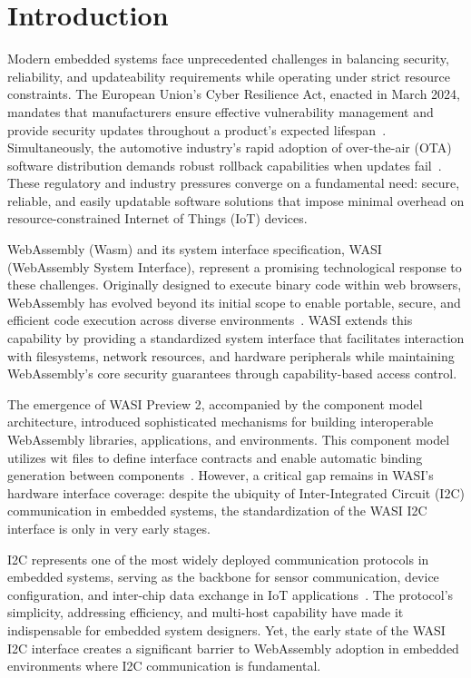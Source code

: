 \chapter{Introduction}
\label{chap:introduction}

Modern embedded systems face unprecedented challenges in balancing security, reliability, and updateability requirements while operating under strict resource constraints. The European Union's Cyber Resilience Act, enacted in March 2024, mandates that manufacturers ensure effective vulnerability management and provide security updates throughout a product's expected lifespan~\cite{eu_cyber_res_act}. Simultaneously, the automotive industry's rapid adoption of over-the-air (OTA) software distribution demands robust rollback capabilities when updates fail~\cite{automotive_ota}. These regulatory and industry pressures converge on a fundamental need: secure, reliable, and easily updatable software solutions that impose minimal overhead on resource-constrained Internet of Things (IoT) devices.

WebAssembly (Wasm) and its system interface specification, WASI (WebAssembly System Interface), represent a promising technological response to these challenges. Originally designed to execute binary code within web browsers, WebAssembly has evolved beyond its initial scope to enable portable, secure, and efficient code execution across diverse environments~\cite{wasm_spec}. WASI extends this capability by providing a standardized system interface that facilitates interaction with filesystems, network resources, and hardware peripherals while maintaining WebAssembly's core security guarantees through capability-based access control.

The emergence of WASI Preview 2, accompanied by the component model architecture, introduced sophisticated mechanisms for building interoperable WebAssembly libraries, applications, and environments. This component model utilizes \acrfull{wit} files to define interface contracts and enable automatic binding generation between components~\cite{wasi_p2}. However, a critical gap remains in WASI's hardware interface coverage: despite the ubiquity of Inter-Integrated Circuit (I2C) communication in embedded systems, the standardization of the WASI I2C interface is only in very early stages.

I2C represents one of the most widely deployed communication protocols in embedded systems, serving as the backbone for sensor communication, device configuration, and inter-chip data exchange in IoT applications~\cite{i2c_specification}. The protocol's simplicity, addressing efficiency, and multi-host capability have made it indispensable for embedded system designers. Yet, the early state of the WASI I2C interface creates a significant barrier to WebAssembly adoption in embedded environments where I2C communication is fundamental.






